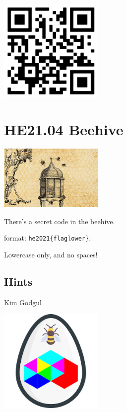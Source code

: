\documentclass[english,a4paper,nols,noindent]{tufte-handout}
\begin{document}
\begin{marginfigure}
    \includegraphics[width=50mm]{ch03/easyone_solved.png}
\end{marginfigure}

\newpage
\hypertarget{he21.04}{%
  \section{HE21.04 Beehive}
  \label{he21.04}}

\begin{marginfigure}
    \includegraphics[width=50mm]{images/challenge4.jpg}
\end{marginfigure}


\noindent There's a secret code in the beehive.

 format: \verb+he2021{flaglower}+.

\noindent Lowercase only, and no spaces!

\subsection{Hints}
Kim Godgul

\begin{marginfigure}
    \includegraphics[width=50mm]{ch04/beehive.png}
\end{marginfigure}
\end{document}
